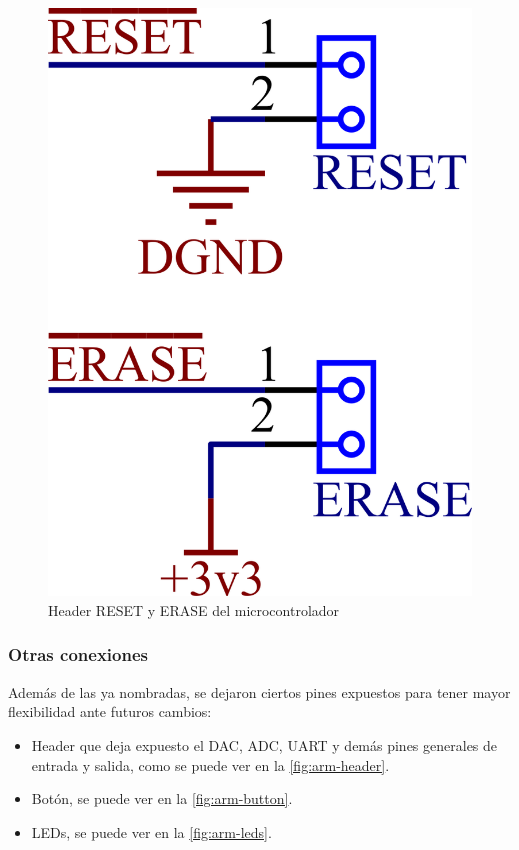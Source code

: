 \documentclass[../et.tex]{subfiles}
\begin{document}
\begin{figure}[!htbp]
  \centering
  \includegraphics[scale=1.5]{../images/arm-reset-erase.png}
  \caption{Header RESET y ERASE del microcontrolador}
  \label{fig:arm-reset-erase}
\end{figure}

\subsubsection{Otras conexiones}
Además de las ya nombradas, se dejaron ciertos pines expuestos para tener mayor flexibilidad ante futuros cambios:

\begin{itemize}
  \item Header que deja expuesto el DAC, ADC, UART y demás pines generales de entrada y salida, como se puede ver en la \autoref{fig:arm-header}.
  \item Botón, se puede ver en la \autoref{fig:arm-button}.
  \item LEDs, se puede ver en la \autoref{fig:arm-leds}.
\end{itemize}
\end{document}
